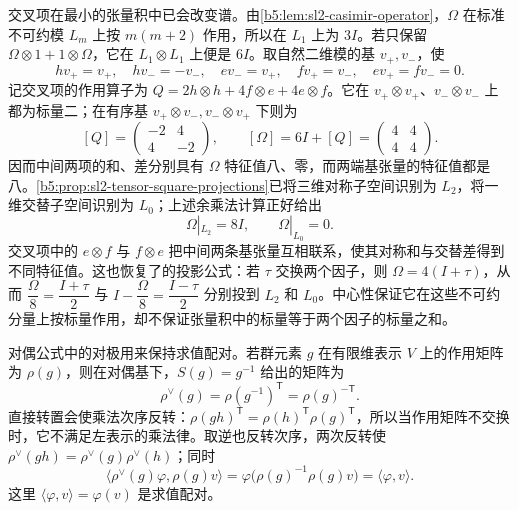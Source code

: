 \ProseParagraphBreak
交叉项在最小的张量积中已会改变谱。由\cref{b5:lem:sl2-casimir-operator}，\(\Omega\) 在标准不可约模 \(L_m\) 上按 \(m(m+2)\) 作用，所以在 \(L_1\) 上为 \(3I\)。若只保留 \(\Omega\otimes1+1\otimes\Omega\)，它在 \(L_1\otimes L_1\) 上便是 \(6I\)。取自然二维模的基 \(v_+,v_-\)，使
\[
	hv_+=v_+,\quad hv_-=-v_-,\quad ev_-=v_+,\quad fv_+=v_-,\quad ev_+=fv_-=0.
\]
记交叉项的作用算子为 \(Q=2h\otimes h+4f\otimes e+4e\otimes f\)。它在 \(v_+\otimes v_+\)、\(v_-\otimes v_-\) 上都为标量二；在有序基 \(v_+\otimes v_-,v_-\otimes v_+\) 下则为
\[
	[Q]=\begin{pmatrix}-2&4\\4&-2\end{pmatrix},\qquad
	[\Omega]=6I+[Q]=\begin{pmatrix}4&4\\4&4\end{pmatrix}.
\]
因而中间两项的和、差分别具有 \(\Omega\) 特征值八、零，而两端基张量的特征值都是八。\cref{b5:prop:sl2-tensor-square-projections}已将三维对称子空间识别为 \(L_2\)，将一维交替子空间识别为 \(L_0\)；上述余乘法计算正好给出
\[
	\Omega|_{L_2}=8I,\qquad \Omega|_{L_0}=0.
\]
交叉项中的 \(e\otimes f\) 与 \(f\otimes e\) 把中间两条基张量互相联系，使其对称和与交替差得到不同特征值。这也恢复了的投影公式：若 \(\tau\) 交换两个因子，则 \(\Omega=4(I+\tau)\)，从而 \(\dfrac{\Omega}{8}=\dfrac{I+\tau}{2}\) 与 \(I-\dfrac{\Omega}{8}=\dfrac{I-\tau}{2}\) 分别投到 \(L_2\) 和 \(L_0\)。中心性保证它在这些不可约分量上按标量作用，却不保证张量积中的标量等于两个因子的标量之和。

\ProseParagraphBreak
对偶公式中的对极用来保持求值配对。若群元素 \(g\) 在有限维表示 \(V\) 上的作用矩阵为 \(\rho(g)\)，则在对偶基下，\(S(g)=g^{-1}\) 给出的矩阵为
\[
	\rho^\vee(g)=\rho(g^{-1})^{\mathsf T}=\rho(g)^{-\mathsf T}.
\]
直接转置会使乘法次序反转：\(\rho(gh)^{\mathsf T}=\rho(h)^{\mathsf T}\rho(g)^{\mathsf T}\)，所以当作用矩阵不交换时，它不满足左表示的乘法律。取逆也反转次序，两次反转使 \(\rho^\vee(gh)=\rho^\vee(g)\rho^\vee(h)\)；同时
\[
	\bigl\langle\rho^\vee(g)\varphi,\rho(g)v\bigr\rangle =\varphi\bigl(\rho(g)^{-1}\rho(g)v\bigr) =\langle\varphi,v\rangle.
\]
这里 \(\langle\varphi,v\rangle=\varphi(v)\) 是求值配对。

